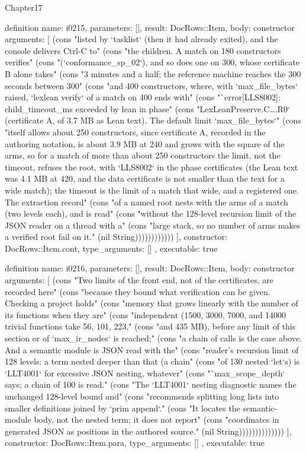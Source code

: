 \begin{lexlean}{Chapter17}
\begin{semanticmodule}
definition{
  name: i0215,
  parameters: [],
  result: DocRows::Item,
  body: constructor{
    arguments: [
      (cons "listed by `tasklist` (then it had already exited), and the console delivers Ctrl-C to" (cons "the children. A match on 180 constructors verifies" (cons "(`conformance_sp_02`), and so does one on 300, whose certificate B alone takes" (cons "3 minutes and a half; the reference machine reaches the 300 seconds between 300" (cons "and 400 constructors, where, with `max_file_bytes` raised, `lexlean verify` of a match on 400 ends with" (cons "`error[LLS8002]: child_timeout_ms exceeded by lean in phase" (cons "LexLeanPreserve.C….R0` (certificate A, of 3.7 MB as Lean text). The default limit `max_file_bytes`" (cons "itself allows about 250 constructors, since certificate A, recorded in the authoring notation, is about 3.9 MB at 240 and grows with the square of the arms, so for a match of more than about 250 constructors the limit, not the timeout, refuses the root, with `LLS8002` in the phase certificates (the Lean text was 4.1 MB at 420, and the data certificate is not smaller than the text for a wide match); the timeout is the limit of a match that wide, and a registered one. The extraction record" (cons "of a named root nests with the arms of a match (two levels each), and is read" (cons "without the 128-level recursion limit of the JSON reader on a thread with a" (cons "large stack, so no number of arms makes a verified root fail on it." (nil String))))))))))))
    ],
    constructor: DocRows::Item.cont,
    type_arguments: []
  },
  executable: true
}

definition{
  name: i0216,
  parameters: [],
  result: DocRows::Item,
  body: constructor{
    arguments: [
      (cons "Two limits of the front end, not of the certificates, are recorded here" (cons "because they bound what verification can be given. Checking a project holds" (cons "memory that grows linearly with the number of its functions when they are" (cons "independent (1500, 3000, 7000, and 14000 trivial functions take 56, 101, 223," (cons "and 435 MB), before any limit of this section or of `max_ir_nodes` is reached;" (cons "a chain of calls is the case above. And a semantic module is JSON read with the" (cons "reader's recursion limit of 128 levels: a term nested deeper than that (a chain" (cons "of 130 nested `let`s) is `LLT4001` for excessive JSON nesting, whatever" (cons "`max_scope_depth` says; a chain of 100 is read." (cons "The `LLT4001` nesting diagnostic names the unchanged 128-level bound and" (cons "recommends splitting long lists into smaller definitions joined by `prim append`." (cons "It locates the semantic-module body, not the nested term; it does not report" (cons "coordinates in generated JSON as positions in the authored source." (nil String))))))))))))))
    ],
    constructor: DocRows::Item.para,
    type_arguments: []
  },
  executable: true
}


\end{semanticmodule}
\end{lexlean}
